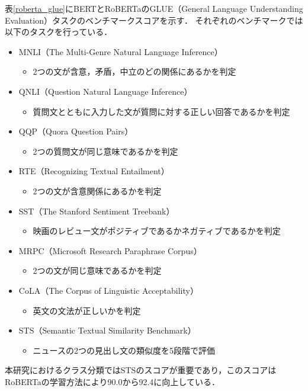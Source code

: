 \documentclass[12pt,a4j,dvipdfmx]{jreport}
\begin{document}
表\ref{roberta_glue}にBERTとRoBERTaのGLUE（General Language Understanding Evaluation）タスクのベンチマークスコアを示す．
それぞれのベンチマークでは以下のタスクを行っている．

\begin{itemize}
  \item MNLI（The Multi-Genre Natural Language Inference）
  \begin{itemize}
    \item 2つの文が含意，矛盾，中立のどの関係にあるかを判定
  \end{itemize}
  \item QNLI（Question Natural Language Inference）
  \begin{itemize}
    \item 質問文とともに入力した文が質問に対する正しい回答であるかを判定
  \end{itemize}
  \item QQP（Quora Question Pairs）
  \begin{itemize}
    \item 2つの質問文が同じ意味であるかを判定
  \end{itemize}
  \item RTE（Recognizing Textual Entailment）
  \begin{itemize}
    \item 2つの文が含意関係にあるかを判定
  \end{itemize}
  \item SST（The Stanford Sentiment Treebank）
  \begin{itemize}
    \item 映画のレビュー文がポジティブであるかネガティブであるかを判定
  \end{itemize}
  \item MRPC（Microsoft Research Paraphrase Corpus）
  \begin{itemize}
    \item 2つの文が同じ意味であるかを判定
  \end{itemize}
  \item CoLA（The Corpus of Linguistic Acceptability）
  \begin{itemize}
    \item 英文の文法が正しいかを判定
  \end{itemize}
  \item STS（Semantic Textual Similarity Benchmark）
  \begin{itemize}
    \item ニュースの2つの見出し文の類似度を5段階で評価
  \end{itemize}
\end{itemize}
本研究におけるクラス分類ではSTSのスコアが重要であり，このスコアはRoBERTaの学習方法により90.0から92.4に向上している．
\end{document}
